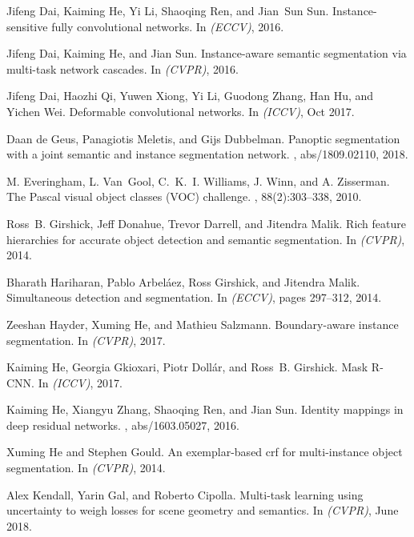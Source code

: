 \documentclass[10pt,twocolumn,letterpaper]{article}
\begin{document}
{\begin{thebibliography}{10}
Jifeng Dai, Kaiming He, Yi Li, Shaoqing Ren, and Jian~Sun Sun.
\newblock Instance-sensitive fully convolutional networks.
\newblock In {\em (ECCV)}, 2016.

Jifeng Dai, Kaiming He, and Jian Sun.
\newblock Instance-aware semantic segmentation via multi-task network cascades.
\newblock In {\em (CVPR)}, 2016.

Jifeng Dai, Haozhi Qi, Yuwen Xiong, Yi Li, Guodong Zhang, Han Hu, and Yichen
  Wei.
\newblock Deformable convolutional networks.
\newblock In {\em (ICCV)}, Oct 2017.

Daan de Geus, Panagiotis Meletis, and Gijs Dubbelman.
\newblock Panoptic segmentation with a joint semantic and instance segmentation
  network.
, abs/1809.02110, 2018.

M. Everingham, L. Van~Gool, C.~K.~I. Williams, J. Winn, and A. Zisserman.
\newblock The {P}ascal visual object classes {(VOC)} challenge.
, 88(2):303--338, 2010.

Ross~B. Girshick, Jeff Donahue, Trevor Darrell, and Jitendra Malik.
\newblock Rich feature hierarchies for accurate object detection and semantic
  segmentation.
\newblock In {\em (CVPR)}, 2014.

Bharath Hariharan, Pablo Arbel{\'a}ez, Ross Girshick, and Jitendra Malik.
\newblock Simultaneous detection and segmentation.
\newblock In {\em (ECCV)}, pages 297--312, 2014.

Zeeshan Hayder, Xuming He, and Mathieu Salzmann.
\newblock Boundary-aware instance segmentation.
\newblock In {\em (CVPR)}, 2017.

Kaiming He, Georgia Gkioxari, Piotr Doll{\'{a}}r, and Ross~B. Girshick.
\newblock Mask {R-CNN}.
\newblock In {\em (ICCV)}, 2017.

Kaiming He, Xiangyu Zhang, Shaoqing Ren, and Jian Sun.
\newblock Identity mappings in deep residual networks.
, abs/1603.05027, 2016.

Xuming He and Stephen Gould.
\newblock An exemplar-based crf for multi-instance object segmentation.
\newblock In {\em (CVPR)}, 2014.

Alex Kendall, Yarin Gal, and Roberto Cipolla.
\newblock Multi-task learning using uncertainty to weigh losses for scene
  geometry and semantics.
\newblock In {\em (CVPR)}, June 2018.


\end{thebibliography}}
\end{document}
